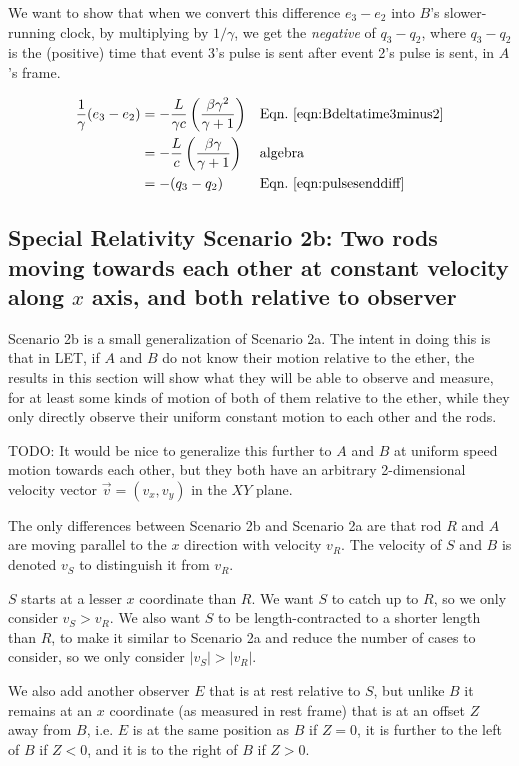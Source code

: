 \documentclass[a4paper]{article}
\theoremstyle{plain}
\theoremstyle{definition}
\newcommand{\vect}[1]{\vec{#1}}
\begin{document}
We want to show that when we convert this difference $e_3 - e_2$ into
$B$'s slower-running clock, by multiplying by $1/\gamma$, we get the
{\em negative} of $q_3 - q_2$, where $q_3 - q_2$ is the (positive)
time that event 3's pulse is sent after event 2's pulse is sent, in
$A$'s frame.

\begin{align*}
\frac{1}{\gamma}(e_3 - e_2)
  & = - \frac{L}{\gamma c} \left( \frac{\beta\gamma^2}{\gamma+1} \right) & & \text{Eqn.~\eqref{eqn:Bdeltatime3minus2}} \\
  & = - \frac{L}{c} \left( \frac{\beta\gamma}{\gamma+1} \right) & & \text{algebra} \\
  & = - (q_3 - q_2) & & \text{Eqn.~\eqref{eqn:pulsesenddiff}}
\end{align*}


\subsection{Special Relativity Scenario 2b: Two rods moving towards each other at constant velocity along $x$ axis, and both relative to observer}
\label{sec:scen2b}

Scenario 2b is a small generalization of Scenario 2a.  The intent in
doing this is that in LET, if $A$ and $B$ do not know their motion
relative to the ether, the results in this section will show what they
will be able to observe and measure, for at least some kinds of motion
of both of them relative to the ether, while they only directly
observe their uniform constant motion to each other and the rods.

TODO: It would be nice to generalize this further to $A$ and $B$ at
uniform speed motion towards each other, but they both have an
arbitrary 2-dimensional velocity vector $\vect v = (v_x, v_y)$ in the
$XY$ plane.

The only differences between Scenario 2b and Scenario 2a are that rod
$R$ and $A$ are moving parallel to the $x$ direction with velocity
$v_R$.  The velocity of $S$ and $B$ is denoted $v_S$ to distinguish it
from $v_R$.

$S$ starts at a lesser $x$ coordinate than $R$.  We want $S$ to catch
up to $R$, so we only consider $v_S > v_R$.  We also want $S$ to be
length-contracted to a shorter length than $R$, to make it similar to
Scenario 2a and reduce the number of cases to consider, so we only
consider $|v_S| > |v_R|$.

We also add another observer $E$ that is at rest relative to $S$, but
unlike $B$ it remains at an $x$ coordinate (as measured in rest frame)
that is at an offset $Z$ away from $B$, i.e. $E$ is at the same
position as $B$ if $Z=0$, it is further to the left of $B$ if $Z < 0$,
and it is to the right of $B$ if $Z > 0$.
\end{document}
